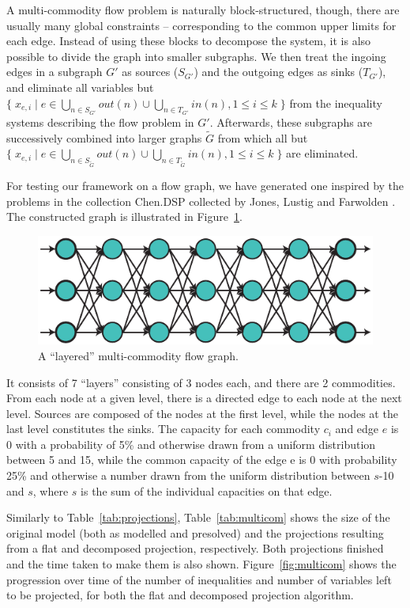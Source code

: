 A multi-commodity flow problem is naturally block-structured, though, there are usually many global constraints -- corresponding to the common upper limits for each edge. Instead of using these blocks to decompose the system, it is also possible to divide the graph into smaller subgraphs. We then treat the ingoing edges in a subgraph $G'$ as sources ($S_{G'}$) and the outgoing edges as sinks ($T_{G'}$), and eliminate all variables but $\{\;x_{e,i}\;|\; e\in \bigcup_{n\in S_{G'}}out(n)\cup \bigcup_{n\in T_{G'}}in(n), 1\leq i\leq k\;\}$ from the inequality systems describing the flow problem in $G'$. Afterwards, these  subgraphs are successively combined into larger graphs $\tilde{G}$ from which all but $\{\;x_{e,i}\;|\; e\in \bigcup_{n\in S_{\tilde G}}out(n)\cup \bigcup_{n\in T_{\tilde G}}in(n), 1\leq i\leq k\;\}$ are eliminated. 


For testing our framework on a flow graph, we have generated one inspired by the problems in the collection Chen.DSP collected by Jones, Lustig and Farwolden \cite{JLFP93}. The constructed graph is illustrated in Figure~\ref{fig:multiflow}. 
\begin{figure}[htbp]
	\centering
		\includegraphics{figures/multiflow.pdf}
	\caption{A ``layered'' multi-commodity flow graph.}
	\label{fig:multiflow}
\end{figure}
It consists of 7 ``layers'' consisting of 3 nodes each, and there are 2 commodities. From each node at a given level, there is a directed edge to each node at the next level. Sources are composed of the nodes at the first level, while the nodes at the last level constitutes the sinks. The capacity for each commodity $c_i$ and edge $e$ is 0 with a probability of 5\% and otherwise drawn from a uniform distribution between 5 and 15, while the common capacity of the edge e is 0 with probability 25\% and otherwise a number drawn from the uniform distribution between $s$-10 and $s$, where $s$ is the sum of the individual capacities on that edge.

Similarly to Table~\ref{tab:projections}, Table~\ref{tab:multicom} shows the size of the original model (both as modelled and presolved) and the projections resulting from a flat and decomposed projection, respectively. Both projections finished and the time taken to make them is also shown. Figure~\ref{fig:multicom} shows the progression over time of the number of inequalities and number of variables left to be projected, for both the flat and decomposed projection algorithm.

